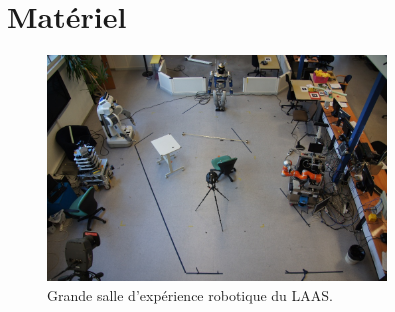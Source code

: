 \documentclass{beamer}
\begin{document}
\section{Matériel}
\begin{frame}
  \begin{figure}
    \includegraphics[width=9cm]{./images/grande_salle.jpg}\\
    Grande salle d'expérience robotique du LAAS.
  \end{figure}
\end{frame}
\end{document}
